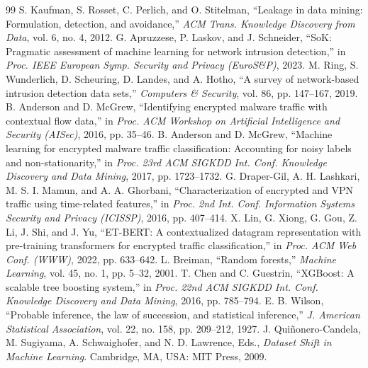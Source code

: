 \documentclass[conference]{IEEEtran}
\begin{document}
\begin{thebibliography}{99}
 S. Kaufman, S. Rosset, C. Perlich, and O. Stitelman, ``Leakage in data mining: Formulation, detection, and avoidance,'' \textit{ACM Trans. Knowledge Discovery from Data}, vol. 6, no. 4, 2012.
 G. Apruzzese, P. Laskov, and J. Schneider, ``SoK: Pragmatic assessment of machine learning for network intrusion detection,'' in \textit{Proc. IEEE European Symp. Security and Privacy (EuroS\&P)}, 2023.
 M. Ring, S. Wunderlich, D. Scheuring, D. Landes, and A. Hotho, ``A survey of network-based intrusion detection data sets,'' \textit{Computers \& Security}, vol. 86, pp. 147--167, 2019.
 B. Anderson and D. McGrew, ``Identifying encrypted malware traffic with contextual flow data,'' in \textit{Proc. ACM Workshop on Artificial Intelligence and Security (AISec)}, 2016, pp. 35--46.
 B. Anderson and D. McGrew, ``Machine learning for encrypted malware traffic classification: Accounting for noisy labels and non-stationarity,'' in \textit{Proc. 23rd ACM SIGKDD Int. Conf. Knowledge Discovery and Data Mining}, 2017, pp. 1723--1732.
 G. Draper-Gil, A. H. Lashkari, M. S. I. Mamun, and A. A. Ghorbani, ``Characterization of encrypted and VPN traffic using time-related fea\-tures,'' in \textit{Proc. 2nd Int. Conf. Information Systems Security and Privacy (ICISSP)}, 2016, pp. 407--414.
 X. Lin, G. Xiong, G. Gou, Z. Li, J. Shi, and J. Yu, ``ET-BERT: A contextualized datagram representation with pre-training transformers for encrypted traffic classification,'' in \textit{Proc. ACM Web Conf. (WWW)}, 2022, pp. 633--642.
 L. Breiman, ``Random forests,'' \textit{Machine Learning}, vol. 45, no. 1, pp. 5--32, 2001.
 T. Chen and C. Guestrin, ``XGBoost: A scalable tree boosting system,'' in \textit{Proc. 22nd ACM SIGKDD Int. Conf. Knowledge Discovery and Data Mining}, 2016, pp. 785--794.
 E. B. Wilson, ``Probable inference, the law of succession, and statistical inference,'' \textit{J. American Statistical Association}, vol. 22, no. 158, pp. 209--212, 1927.
 J. Qui\~nonero-Candela, M. Sugiyama, A. Schwaighofer, and N. D. Lawrence, Eds., \textit{Dataset Shift in Machine Learning}. Cambridge, MA, USA: MIT Press, 2009.
\end{thebibliography}
\end{document}
